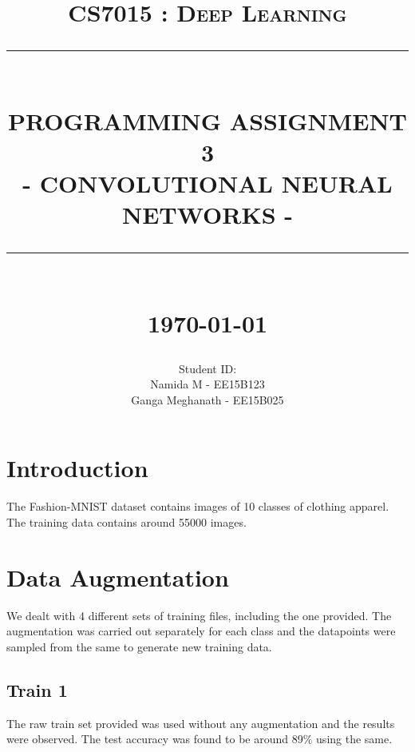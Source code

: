 \documentclass[12pt]{report}
\newcommand{\HRule}[1]{\rule{\linewidth}{#1}}
\begin{document}
\title{ \normalsize \textsc{CS7015 : Deep Learning}
		\\ [2.0cm]
		\HRule{0.5pt} \\
		\LARGE \textbf{\uppercase{Programming Assignment 3}}\\
        \large{- CONVOLUTIONAL NEURAL NETWORKS -}
		\HRule{2pt} \\ [0.5cm]
		\normalsize \today \vspace*{5\baselineskip}}

\date{}

\author{
		Student ID:  \\ 
		Namida M - EE15B123 \\
		Ganga Meghanath - EE15B025
		}

\renewcommand\thesection{\arabic{section}}
\maketitle
\tableofcontents
\newpage

\sectionfont{\scshape}


\section{Introduction}
 The Fashion-MNIST dataset contains images of 10 classes of clothing apparel. The training data contains around 55000 images.

\section{Data Augmentation}
We dealt with 4 different sets of training files, including the one provided.
The augmentation was carried out separately for each class and the datapoints were sampled from the same to generate new training data.

\subsection{Train 1}
The raw train set provided was used without any augmentation and the results were observed. The test accuracy was found to be around 89$\%$ using the same.
\end{document}
